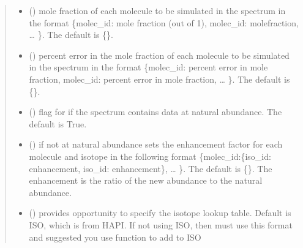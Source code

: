 \documentclass[letterpaper,10pt,english]{sphinxmanual}
\begin{document}
\begin{fulllineitems}
\begin{quote}
\begin{description}
\begin{itemize}
\item {} 
\sphinxAtStartPar
{} (\sphinxstyleliteralemphasis{\sphinxupquote{, }}) \textendash{} mole fraction of each molecule to be simulated in the spectrum in the format \{molec\_id: mole fraction (out of 1), molec\_id: molefraction, … \}. The default is \{\}.

\item {} 
\sphinxAtStartPar
{} (\sphinxstyleliteralemphasis{\sphinxupquote{, }}) \textendash{} percent error in the mole fraction of each molecule to be simulated in the spectrum in the format \{molec\_id: percent error in mole fraction, molec\_id: percent error in mole fraction, … \}. The default is \{\}.

\item {} 
\sphinxAtStartPar
{} (\sphinxstyleliteralemphasis{\sphinxupquote{, }}) \textendash{} flag for if the spectrum contains data at natural abundance. The default is True.

\item {} 
\sphinxAtStartPar
{} (\sphinxstyleliteralemphasis{\sphinxupquote{, }}) \textendash{} if not at natural abundance sets the enhancement factor for each molecule and isotope in the following format \{molec\_id:\{iso\_id: enhancement, iso\_id: enhancement\}, … \}. The default is \{\}.  The enhancement is the ratio of the new abundance to the natural abundance.

\item {} 
\sphinxAtStartPar
{} (\sphinxstyleliteralemphasis{\sphinxupquote{, }}) \textendash{} provides opportunity to specify the isotope look\sphinxhyphen{}up table.  Default is ISO, which is from HAPI.  If not using ISO, then must use this format and suggested you use function to add to ISO


\end{itemize}
\end{description}
\end{quote}
\end{fulllineitems}
\end{document}
